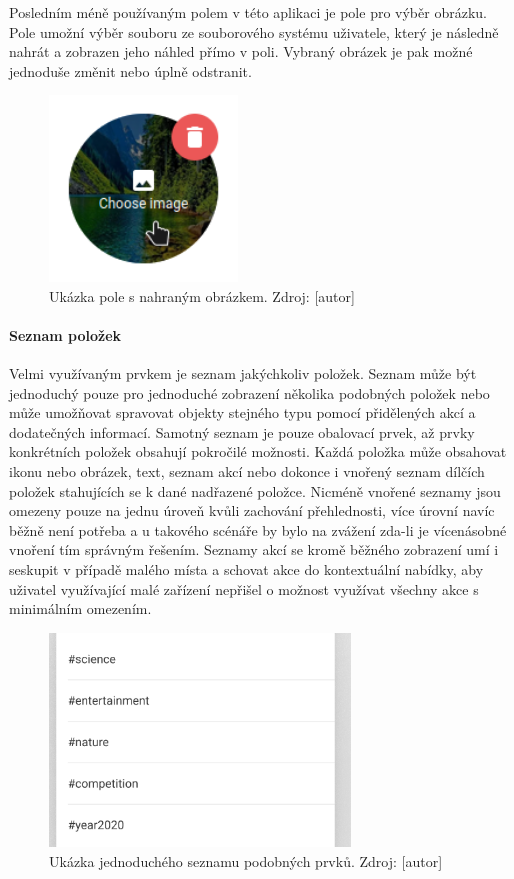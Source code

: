 			Posledním méně používaným polem v této aplikaci je pole pro výběr obrázku.
			Pole umožní výběr souboru ze souborového systému uživatele, který je následně nahrát a zobrazen jeho náhled
			přímo v poli.
			Vybraný obrázek je pak možné jednoduše změnit nebo úplně odstranit.

			\begin{figure}[H]
				\centering
				\includegraphics[width=5cm]{obrazky/obrazkove_pole}\hfill
				\caption{Ukázka pole s nahraným obrázkem. Zdroj: [autor]}
			\end{figure}

			\paragraph{Seznam položek}

			Velmi využívaným prvkem je seznam jakýchkoliv položek.
			Seznam může být jednoduchý pouze pro jednoduché zobrazení několika podobných položek nebo může umožňovat
			spravovat objekty stejného typu pomocí přidělených akcí a dodatečných informací.
			Samotný seznam je pouze obalovací prvek, až prvky konkrétních položek obsahují pokročilé možnosti.
			Každá položka může obsahovat ikonu nebo obrázek, text, seznam akcí nebo dokonce i vnořený seznam dílčích
			položek stahujících se k dané nadřazené položce.
			Nicméně vnořené seznamy jsou omezeny pouze na jednu úroveň kvůli zachování přehlednosti, více úrovní navíc
			běžně není potřeba a u takového scénáře by bylo na zvážení zda-li je vícenásobné vnoření tím správným řešením.
			Seznamy akcí se kromě běžného zobrazení umí i seskupit v případě malého místa a schovat akce do kontextuální
			nabídky, aby uživatel využívající malé zařízení nepřišel o možnost využívat všechny akce s minimálním omezením.

			\begin{figure}[H]
				\centering
				\includegraphics[width=8cm]{obrazky/jednoduchy_seznam}\hfill
				\caption{Ukázka jednoduchého seznamu podobných prvků. Zdroj: [autor]}
			\end{figure}

